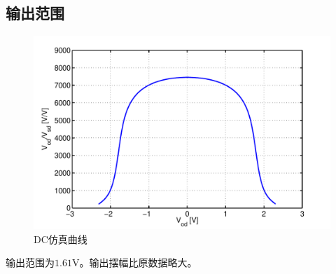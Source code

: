 \documentclass[a4paper]{article}
\newcommand{\uV}{\si{\volt}}
\begin{document}
\subsection{输出范围}
\begin{figure}[htb]
    \begin{center}
        \includegraphics[width=\textwidth]{fast/dc.pdf}
    \end{center}
    \caption{DC仿真曲线}
    \label{fastdc}
\end{figure}
输出范围为$1.61\uV$。输出摆幅比原数据略大。
\newpage
\end{document}

